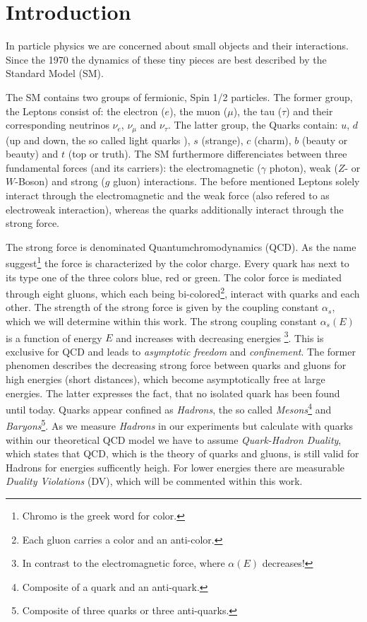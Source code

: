 \documentclass[../../index.tex]{subfiles}
\begin{document}
\chapter{Introduction}
In particle physics we are concerned about small objects and their interactions.
Since the 1970 the dynamics of these tiny pieces are best described by the Standard Model (SM).

The SM contains two groups of fermionic, Spin 1/2 particles. The former group,
the Leptons consist of: the electron ($e$), the muon ($\mu$), the tau ($\tau$)
and their corresponding neutrinos $\nu_e$, $\nu_\mu$ and $\nu_\tau$. The latter
group, the Quarks contain: $u$, $d$ (up and down, the so called light quarks ),
$s$ (strange), $c$ (charm), $b$ (beauty or beauty) and $t$ (top or truth). The SM
furthermore differenciates between three fundamental forces (and its carriers):
the electromagnetic ($\gamma$ photon), weak ($Z$- or $W$-Boson) and strong ($g$
gluon) interactions. The before mentioned Leptons solely interact through the
electromagnetic and the weak force (also refered to as electroweak interaction),
whereas the quarks additionally interact through the strong force.

The strong force is denominated Quantumchromodynamics
(QCD). As the name suggest\footnote{Chromo is the greek word for color.} the
force is characterized by the color charge. Every quark has next to its type one
of the three colors blue, red or green. The color force is mediated through
eight gluons, which each being bi-colored\footnote{Each gluon carries a color
  and an anti-color.}, interact with quarks and each other. The strength of the
strong force is given by the coupling constant $\alpha_s$, which we will
determine within this work. The strong coupling constant $\alpha_s(E)$ is a function of energy $E$ and increases
with decreasing energies \footnote{In contrast to the electromagnetic force, where $\alpha(E)$
  decreases!}. This is exclusive for QCD and leads to \textit{asymptotic freedom} and
\textit{confinement}. The former phenomen describes the decreasing strong force
between quarks and gluons for high energies (short distances), which become asymptotically free at large
energies. The latter expresses the fact, that no isolated quark has been found
until today. Quarks appear confined as \textit{Hadrons}, the so called
\textit{Mesons}\footnote{Composite of a quark and an anti-quark.} and
\textit{Baryons}\footnote{Composite of three quarks or three anti-quarks.}.
As we measure \textit{Hadrons} in our experiments but calculate with quarks
within our theoretical QCD model we have to assume \textit{Quark-Hadron
  Duality}, which states that QCD, which is the theory of quarks and gluons, is still valid for Hadrons for energies
sufficently heigh. For lower energies there are measurable \textit{Duality Violations} (DV), which
will be commented within this work.
\end{document}
